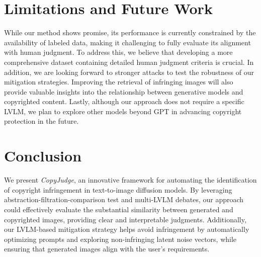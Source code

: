 \section{Limitations and Future Work}
\label{limitation}
While our method shows promise, its performance is currently constrained by the availability of labeled data, making it challenging to fully evaluate its alignment with human judgment. To address this, we believe that developing a more comprehensive dataset containing detailed human judgment criteria is crucial. In addition, we are looking forward to stronger attacks to test the robustness of our mitigation strategies. Improving the retrieval of infringing images will also provide valuable insights into the relationship between generative models and copyrighted content. Lastly, although our approach does not require a specific LVLM, we plan to explore other models beyond GPT in advancing copyright protection in the future.

\section{Conclusion}
\label{conclusion}
We present \textit{CopyJudge}, an innovative framework for automating the identification of copyright infringement in text-to-image diffusion models. By leveraging abstraction-filtration-comparison test and multi-LVLM debates, our approach could effectively evaluate the substantial similarity between generated and copyrighted images, providing clear and interpretable judgments. Additionally, our LVLM-based mitigation strategy helps avoid infringement by automatically optimizing prompts and exploring non-infringing latent noise vectors, while ensuring that generated images align with the user's requirements.








